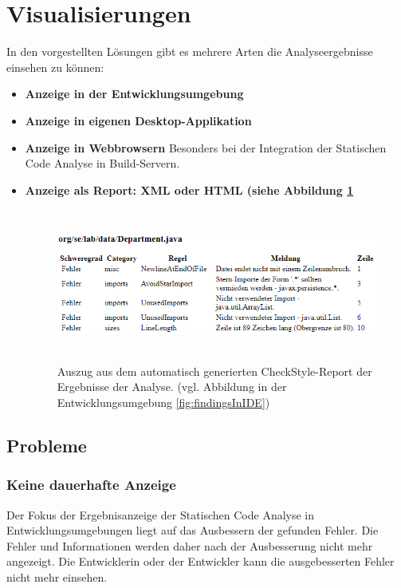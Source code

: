\section{Visualisierungen} 
In den vorgestellten Lösungen gibt es mehrere Arten die Analyseergebnisse einsehen zu können:
\begin{itemize}
\item \textbf{Anzeige in der Entwicklungsumgebung}
\item \textbf{Anzeige in eigenen Desktop-Applikation}
\item \textbf{Anzeige in Webbrowsern}
Besonders bei der Integration der Statischen Code Analyse in Build-Servern.
\item \textbf{Anzeige als Report: XML oder HTML (siehe Abbildung \ref{fig:checkstyleHTMLReport}}
\begin{figure}[tp]
  \centering
  \includegraphics[height=5cm]{images/checkstyleHTMLReport.PNG}
 \caption[Auszug aus dem automatisch generierten CheckStyle-Report der Ergebnisse der Analyse.]{Auszug aus dem automatisch generierten CheckStyle-Report der Ergebnisse der Analyse. (vgl. Abbildung in der Entwicklungsumgebung \ref{fig:findingsInIDE})}
  \label{fig:checkstyleHTMLReport}
\end{figure}
\end{itemize}
\subsection{Probleme} 

\subsubsection{Keine dauerhafte Anzeige} 
Der Fokus der Ergebnisanzeige der Statischen Code Analyse in Entwicklungsumgebungen liegt auf das Ausbessern der gefunden Fehler. Die Fehler und Informationen werden daher nach der Ausbesserung nicht mehr angezeigt. Die Entwicklerin oder der Entwickler kann die ausgebesserten Fehler nicht mehr einsehen.

